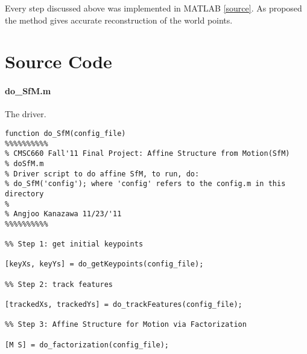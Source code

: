 Every step discussed above was implemented in MATLAB \ref{source}. As
proposed the method gives accurate reconstruction of the world
points. 

\appendix

\section{Source Code}
\paragraph{do\_SfM.m}
The driver.
\begin{verbatim}
function do_SfM(config_file)
%%%%%%%%%%
% CMSC660 Fall'11 Final Project: Affine Structure from Motion(SfM)
% doSfM.m
% Driver script to do affine SfM, to run, do:
% do_SfM('config'); where 'config' refers to the config.m in this directory
%
% Angjoo Kanazawa 11/23/'11
%%%%%%%%%%

%% Step 1: get initial keypoints

[keyXs, keyYs] = do_getKeypoints(config_file); 

%% Step 2: track features

[trackedXs, trackedYs] = do_trackFeatures(config_file);

%% Step 3: Affine Structure for Motion via Factorization

[M S] = do_factorization(config_file);
\end{verbatim}
